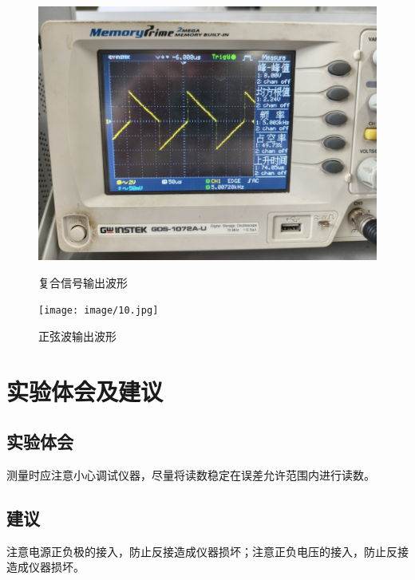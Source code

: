 \documentclass[12pt, a4paper]{article}
\begin{document}
\begin{figure}
\begin{minipage}{0.45\textwidth}
    \end{minipage}
    \begin{minipage}{0.45\textwidth}
        \centering
        \includegraphics[width=\linewidth]{image/9.jpg}
        \caption{复合信号输出波形}
        \label{fig:复合信号输出波形}
    \end{minipage}\hfill
    \begin{minipage}{0.45\textwidth}
        \centering
        \texttt{[image: image/10.jpg]}
        \caption{正弦波输出波形}
        \label{fig:正弦波输出波形}
    \end{minipage}
\end{figure}



\clearpage
\section{实验体会及建议}

\subsection{实验体会}
测量时应注意小心调试仪器，尽量将读数稳定在误差允许范围内进行读数。

\subsection{建议}
注意电源正负极的接入，防止反接造成仪器损坏；注意正负电压的接入，防止反接造成仪器损坏。
\end{document}
